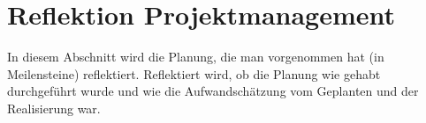 \section{Reflektion Projektmanagement}
In diesem Abschnitt wird die Planung, die man vorgenommen hat
(in Meilensteine) reflektiert. 
Reflektiert wird, ob die Planung wie gehabt durchgeführt wurde und 
wie die Aufwandschätzung vom Geplanten und der Realisierung war.

\subsection{}
